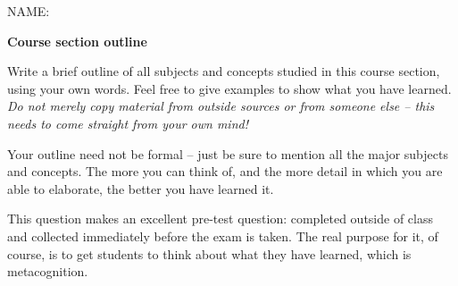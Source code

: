 

\noindent
NAME: \underbar{\hskip 150pt}

\centerline{\bf Course section outline} \medskip

Write a brief outline of all subjects and concepts studied in this course section, using your own words.  Feel free to give examples to show what you have learned.  {\it Do not merely copy material from outside sources or from someone else -- this needs to come straight from your own mind!}

\vskip 400pt







Your outline need not be formal -- just be sure to mention all the major subjects and concepts.  The more you can think of, and the more detail in which you are able to elaborate, the better you have learned it.







This question makes an excellent pre-test question: completed outside of class and collected immediately before the exam is taken.  The real purpose for it, of course, is to get students to think about what they have learned, which is metacognition.




